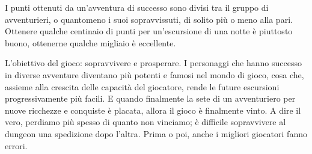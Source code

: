 I punti ottenuti da un'avventura di successo sono divisi tra il gruppo di avventurieri, o quantomeno i suoi sopravvissuti, di solito più o meno alla pari. Ottenere qualche centinaio di punti per un'escursione di una notte è piuttosto buono, ottenerne qualche migliaio è eccellente.

L'obiettivo del gioco: sopravvivere e prosperare. I personaggi che hanno successo in diverse avventure diventano più potenti e famosi nel mondo di gioco, cosa che, assieme alla crescita delle capacità del giocatore, rende le future escursioni progressivamente più facili. E quando finalmente la sete di un avventuriero per nuove ricchezze e conquiste è placata, allora il gioco è finalmente vinto. A dire il vero, perdiamo più spesso di quanto non vinciamo; è difficile sopravvivere al dungeon una spedizione dopo l'altra. Prima o poi, anche i migliori giocatori fanno errori.

